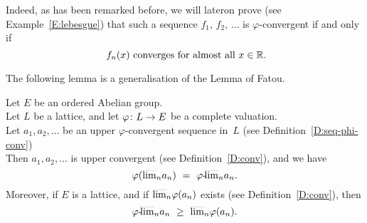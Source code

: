 \documentclass[main.tex]{subfiles}
\begin{document}
\begin{ex}
Indeed,
as has been remarked before,
we will lateron prove 
(see Example~\ref{E:lebesgue}) that such a sequence $f_1,\,f_2,\,\dotsc$
is $\varphi$-convergent if and only if 
\begin{equation*}
\text{ $f_n(x)$ converges for almost all~$x\in\mathbb{R}$.}
\end{equation*}
\end{ex}

%
%
\noindent The following lemma
is a generalisation of the Lemma of Fatou.
\begin{lem}
\label{L:fatou}
Let $E$ be an ordered Abelian group.\\
Let $L$ be a lattice,
and let $\varphi\colon L \rightarrow E$ be a 
complete valuation.\\
Let $a_1,a_2,\dotsc$ be an upper $\varphi$-convergent
sequence in~$L$
(see Definition~\ref{D:seq-phi-conv}) \\
Then $a_1,a_2,\dotsc$ is upper convergent
(see Definition~\ref{D:conv}),
and we have
\begin{equation*}
\varphi(\ulim{n}a_n) \ =\ 
\pulim\varphi{n} a_n.
\end{equation*}
Moreover,
if $E$ is a lattice, and
if $\smash{\overline{\lim}_{n}}\varphi(a_n)$ exists
(see Definition~\ref{D:conv}), then
\begin{equation*}
{\varphi}\text{-}\!\smash{\overline{\lim}_{n}}a_n
\ \geq\  
\smash{\overline{\lim}_{n}}\varphi(a_n) .
\end{equation*}
\end{lem}
\end{document}
